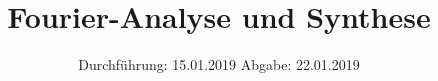 

\subject{Nr. 351}
\title{Fourier-Analyse und Synthese}
\date{%
  Durchführung: 15.01.2019
  \hspace{3em}
  Abgabe: 22.01.2019
}



\maketitle
\thispagestyle{empty}
\tableofcontents
\newpage






\printbibliography{}


